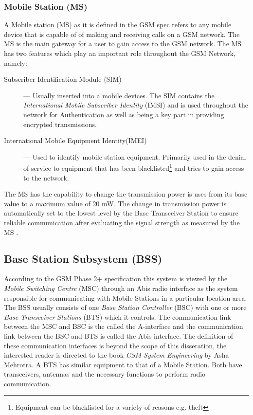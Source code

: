 \subsubsection{Mobile Station (MS)}
A Mobile station (MS) as it is defined in the GSM spec refers to any mobile device that is capable of of making and receiving calls on a GSM network.  The MS is the main gateway 
for a user to gain access to the GSM network. The MS has two features which play an important role throughout the GSM Network, namely:
\begin{description}
\item[Subscriber Identification Module (SIM)] --- Usually inserted into a mobile devices. The SIM contains the \emph{International Mobile Subscriber Identity} (IMSI) and is used throughout the network 
for Authentication as well as being a key part in providing encrypted transmissions.
\item[International Mobile Equipment Identity(IMEI)] --- Used to identify mobile station equipment. Primarily used in the denial of service to equipment that has been blacklisted\footnote{Equipment can be blacklisted for a variety of reasons e.g. theft} and tries to gain access to the network.
\end{description}
The MS has the capability to change the transmission power is uses from its base value to a maximum value of 20 mW. The change in transmission power is automatically set to the lowest level by the Base Transceiver Station to ensure reliable communication after evaluating the signal strength as measured by the MS \cite{GSMSysEngin}. %

\subsection{Base Station Subsystem (BSS)}

According to the GSM Phase 2+ specification this system is viewed by the \emph{Mobile Switching Centre} (MSC) through an Abis radio interface as the system responsible for communicating with Mobile Stations in a particular location area. The BSS usually consists of one \emph{Base Station Controller} (BSC) with one or more \emph{Base Transceiver Stations} (BTS) which it controls. The communication link between the MSC and BSC is the called the A-interface and the communication link between the BSC and BTS is called the Abis interface. The definition of these communication interfaces is beyond the scope of this disseration, the interested reader is directed to the book \emph{GSM System Engineering} by Asha Mehrotra. A BTS has similar equipment to that of a Mobile Station. Both have transceivers, antennas and the necessary functions to perform radio communication. 

